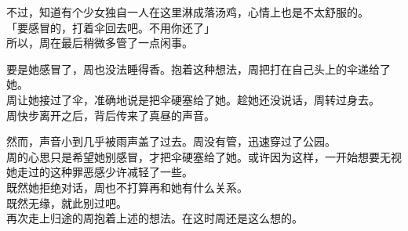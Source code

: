 不过，知道有个少女独自一人在这里淋成落汤鸡，心情上也是不太舒服的。\\

「要感冒的，打着伞回去吧。不用你还了」\\

所以，周在最后稍微多管了一点闲事。

要是她感冒了，周也没法睡得香。抱着这种想法，周把打在自己头上的伞递给了她。\\

周让她接过了伞，准确地说是把伞硬塞给了她。趁她还没说话，周转过身去。\\

周快步离开之后，背后传来了真昼的声音。

然而，声音小到几乎被雨声盖了过去。周没有管，迅速穿过了公园。\\

周的心思只是希望她别感冒，才把伞硬塞给了她。或许因为这样，一开始想要无视她走过的这种罪恶感少许减轻了一些。\\

既然她拒绝对话，周也不打算再和她有什么关系。\\

既然无缘，就此别过吧。\\

再次走上归途的周抱着上述的想法。在这时周还是这么想的。
